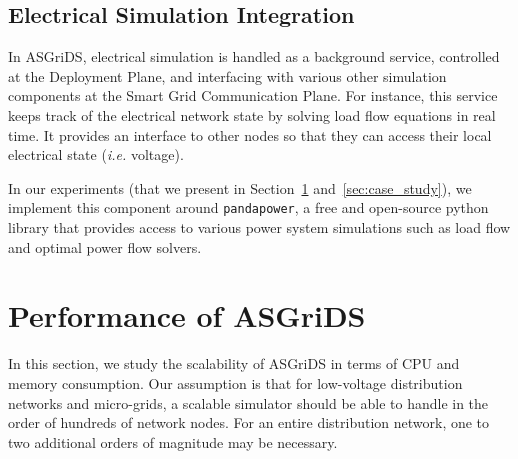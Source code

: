\documentclass[conference]{IEEEtran}
\begin{document}


	


\subsection{Electrical Simulation Integration}

In ASGriDS, electrical simulation is handled as a background service, controlled at the Deployment Plane, and interfacing with various other simulation components at the Smart Grid Communication Plane. For instance, this service keeps track of the electrical network state by solving load flow equations in real time. It provides an interface to other nodes so that they can access their local electrical state (\emph{i.e.} voltage).

In our experiments (that we present in Section~\ref{perf} and~\ref{sec:case_study}), we implement this component around \texttt{pandapower}, a free and open-source python library that provides access to various power system simulations such as load flow and optimal power flow solvers. 

\section{Performance of ASGriDS}\label{perf}

In this section, we study the scalability of ASGriDS in terms of CPU and memory consumption. Our assumption is that for low-voltage distribution networks and micro-grids, a scalable simulator should be able to handle in the order of hundreds of network nodes. For an entire distribution network, one to two additional orders of magnitude may be necessary. 
\end{document}
